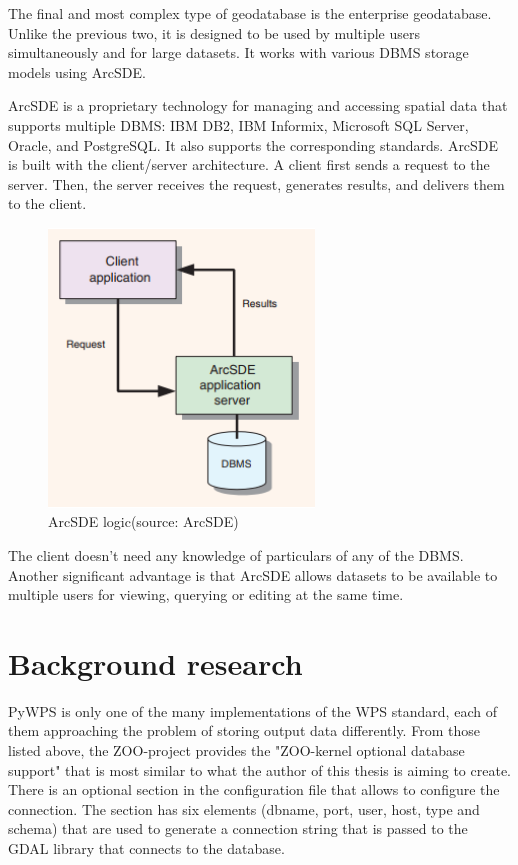 The final and most complex type of geodatabase is the enterprise
geodatabase. Unlike the previous two, it is designed to be used by
multiple users simultaneously and for large datasets. It works with
various DBMS storage models using ArcSDE.

ArcSDE is a proprietary technology for managing and accessing spatial
data that supports multiple DBMS: IBM DB2, IBM Informix, Microsoft SQL
Server, Oracle, and PostgreSQL.\cite{arcsdedoc} It also supports the
corresponding standards. ArcSDE is built with the client/server
architecture. A client first sends a request to the server. Then, the
server receives the request, generates results, and delivers them to
the client.

\begin{figure}[H] \centering
      \includegraphics[width=200pt]{./pictures/arcsdeobr.png}
      \caption[ArcSDE logic]{ArcSDE logic(source: ArcSDE)}
      \label{fig:ArcSDE logic}
  \end{figure}

The client doesn't need any knowledge of particulars of any of the
DBMS. Another significant advantage is that ArcSDE allows datasets to
be available to multiple users for viewing, querying or editing at the
same time.\cite{esritypes}

\section{Background research}


PyWPS is only one of the many implementations of the WPS standard,
each of them approaching the problem of storing output data
differently. From those listed above, the ZOO-project provides the
"ZOO-kernel optional database support" \cite{zoodb} that is most
similar to what the author of this thesis is aiming to create. There
is an optional section in the configuration file that allows to
configure the connection. The section has six elements (dbname, port,
user, host, type and schema) that are used to generate a connection
string that is passed to the GDAL library that connects to the
database.\cite{zoodbsec}


